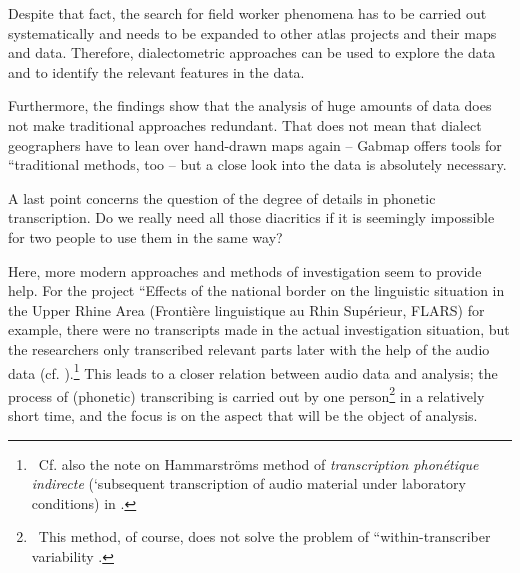 \documentclass[output=paper]{LSP/langsci}
\begin{document}
Despite that fact, the search for field worker phenomena has to be carried out systematically and needs to be expanded to other atlas projects and their maps and data. Therefore, dialectometric approaches can be used to explore the data and to identify the relevant features in the data.

Furthermore, the findings show that the analysis of huge amounts of data does not make traditional approaches redundant. That does not mean that dialect geographers have to lean over hand-drawn maps again – Gabmap offers tools for ``traditional{\textquotedbl} methods, too – but a close look into the data is absolutely necessary.

A last point concerns the question of the degree of details in phonetic transcription. Do we really need all those diacritics if it is seemingly impossible for two people to use them in the same way?

Here, more modern approaches and methods of investigation seem to provide help. For the project ``Effects of the national border on the linguistic situation in the Upper Rhine Area{\textquotedbl} (Frontière linguistique au Rhin Supérieur, FLARS) for example, there were no transcripts made in the actual investigation situation, but the researchers only transcribed relevant parts later with the help of the audio data (cf. \citealt{auer_auswirkungen_2015}).\footnote{\ Cf. also the note on Hammarström{\textquotesingle}s method of \textit{transcription phonétique indirecte} (`subsequent transcription of audio material under laboratory conditions{\textquotesingle}) in \citet[73]{hotzenkocherle_einfuhrung_1962}.} This leads to a closer relation between audio data and analysis; the process of (phonetic) transcribing is carried out by one person\footnote{\ This method, of course, does not solve the problem of ``within-transcriber variability{\textquotedbl} \citep[258]{kerswill_limits_1990}.} in a relatively short time, and the focus is on the aspect that will be the object of analysis.

\printbibliography[heading=subbibliography,notkeyword=this]
\end{document}
